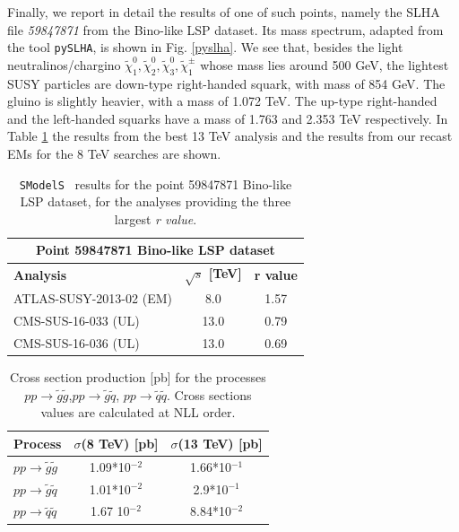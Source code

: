 \documentclass[a4paper,11pt]{article}
\newcommand{\SMO}{\texttt{SModelS\xspace}}
\newcommand{\RVALUE}{\textit{r value}}
\begin{document}
Finally, we report in detail the results of one of such points, namely the SLHA file \textit{59847871} from the Bino-like LSP dataset. Its mass spectrum, adapted from the tool \texttt{pySLHA}\cite{Buckley:2013jua}, is shown in Fig. \ref{pyslha}. We see that, besides the light neutralinos/chargino $\tilde \chi _1 ^0,\tilde \chi _2 ^0,\tilde \chi _3 ^0,\tilde \chi _1 ^{\pm}$ whose mass lies around 500 GeV, the lightest SUSY particles are down-type right-handed squark, with mass of 854 GeV. The gluino is slightly heavier, with a mass of 1.072 TeV. The up-type right-handed and the left-handed squarks have a mass of 1.763 and 2.353 TeV respectively. In Table \ref{tab_13tev} the results from the best 13 TeV analysis and the results from our recast EMs for the 8 TeV searches are shown.
%
%
\begin{table}[!h]
	\footnotesize
	\begin{center}
		\renewcommand{\arraystretch}{1.1}
		\begin{tabular}{ l c c}  \toprule \toprule
			\multicolumn{3}{c}{Point 59847871 Bino-like LSP dataset} \\ \toprule 
			\textbf{Analysis} & \textbf{$\sqrt{s}$ [TeV]}  & \textbf{r value} \\  \toprule
			ATLAS-SUSY-2013-02 (EM) & 8.0  &  1.57 \\
			CMS-SUS-16-033 (UL) & 13.0 & 0.79 \\
			CMS-SUS-16-036 (UL) & 13.0 & 0.69 \\
			\bottomrule
		\end{tabular}
	\end{center}
	\caption{\SMO~ results for the point 59847871 Bino-like LSP dataset, for the analyses providing the three largest \RVALUE. }
	\label{tab_13tev}
\end{table}
%
%
\begin{table}[!h]
	\footnotesize
	\begin{center}
		\renewcommand{\arraystretch}{1.1}
		\begin{tabular}{ l c c}  \toprule \toprule
			\textbf{Process} & $\sigma$(8 TeV) [pb]  & $\sigma$(13 TeV) [pb] \\  \toprule
			$pp \rightarrow \tilde g \tilde g$ & 1.09*10$^{-2}$ & 1.66*10$^{-1}$\\
			$pp \rightarrow \tilde g \tilde q$ & 1.01*10$^{-2}$ &  2.9*10$^{-1}$ \\
			$pp \rightarrow \tilde q \tilde q$ & 1.67 10$^{-2}$ & 8.84*10$^{-2}$ \\
			\bottomrule
		\end{tabular}
	\end{center}
	\caption{Cross section production [pb] for the processes $pp \rightarrow \tilde g \tilde g$,$pp \rightarrow \tilde g \tilde q$, $pp \rightarrow \tilde q \tilde q$. Cross sections values are calculated at NLL order.}
	\label{cross_sections}
\end{table}
\end{document}
